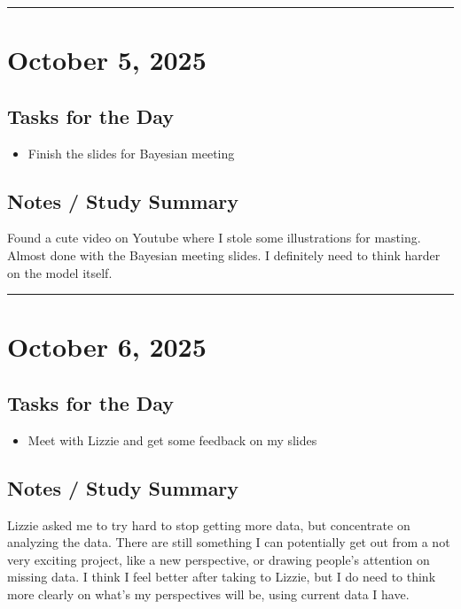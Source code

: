 \documentclass[12pt]{article}
\begin{document}
\vspace{1em}
\hrule
\vspace{1em}
\section*{October 5, 2025}

\subsection*{Tasks for the Day}
\begin{itemize}
    \item Finish the slides for Bayesian meeting
\end{itemize}
\subsection*{Notes / Study Summary}
Found a cute video on Youtube where I stole some illustrations for masting. Almost done with the Bayesian meeting slides. I definitely need to think harder on the model itself.

\vspace{1em}
\hrule
\vspace{1em}

\section*{October 6, 2025}

\subsection*{Tasks for the Day}
\begin{itemize}
    \item Meet with Lizzie and get some feedback on my slides
\end{itemize}
\subsection*{Notes / Study Summary}
Lizzie asked me to try hard to stop getting more data, but concentrate on analyzing the data. There are still something I can potentially get out from a not very exciting project, like a new perspective, or drawing people's attention on missing data. I think I feel better after taking to Lizzie, but I do need to think more clearly on what's my perspectives will be, using current data I have.
\end{document}
